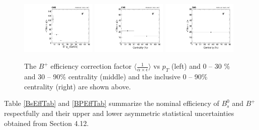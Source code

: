 \begin{figure}[h]
\begin{center}
\includegraphics[width= 0.32\textwidth]{Figures/Chapter4/BPEffPlotPt.pdf}
\includegraphics[width= 0.32\textwidth]{Figures/Chapter4/BPEffPlotCent.pdf}
\includegraphics[width= 0.32\textwidth]{Figures/Chapter4/BPEffPlotCentInc.pdf}
\caption{The  $B^+$ efficiency correction factor $\langle \frac{1}{\alpha \times \epsilon} \rangle$ vs $p_T$ (left) and 0 -- 30 \% and 30 -- 90\% centrality (middle) and the inclusive 0 -- 90\% centrality (right) are shown above.}
\label{BPEffFig}
\end{center}
\end{figure}




Table \ref{BsEffTab} and \ref{BPEffTab} summarize the nominal efficiency of $B^0_s$ and $B^+$ respectfully and their upper and lower asymmetric statistical uncertainties obtained from Section 4.12.


